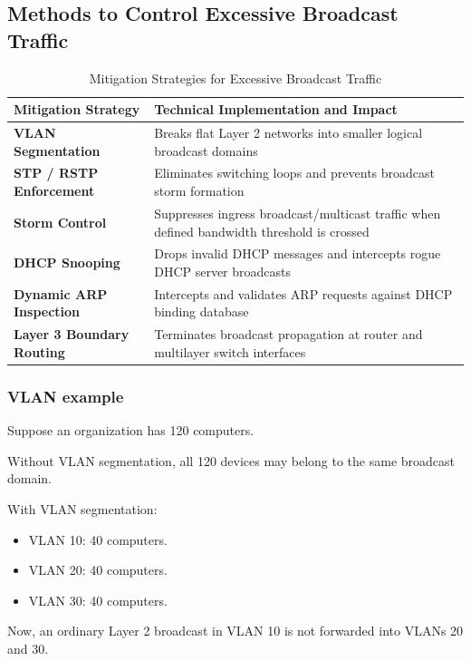 \subsection{Methods to Control Excessive Broadcast Traffic}
\begin{table}[htbp]
\centering
\caption{Mitigation Strategies for Excessive Broadcast Traffic}
\label{tab:broadcast_mitigation_strategies}
\begin{tabularx}{\textwidth}{p{3.8cm} X}
\toprule
\textbf{Mitigation Strategy} & \textbf{Technical Implementation and Impact} \\
\midrule
\textbf{VLAN Segmentation} & Breaks flat Layer 2 networks into smaller logical broadcast domains \\
\textbf{STP / RSTP Enforcement} & Eliminates switching loops and prevents broadcast storm formation \\
\textbf{Storm Control} & Suppresses ingress broadcast/multicast traffic when defined bandwidth threshold is crossed \\
\textbf{DHCP Snooping} & Drops invalid DHCP messages and intercepts rogue DHCP server broadcasts \\
\textbf{Dynamic ARP Inspection} & Intercepts and validates ARP requests against DHCP binding database \\
\textbf{Layer 3 Boundary Routing} & Terminates broadcast propagation at router and multilayer switch interfaces \\
\bottomrule
\end{tabularx}
\end{table}


\subsubsection{VLAN example}

Suppose an organization has 120 computers.

Without VLAN segmentation, all 120 devices may belong to the same broadcast domain.

With VLAN segmentation:

\begin{itemize}
\item VLAN 10: 40 computers.
\item VLAN 20: 40 computers.
\item VLAN 30: 40 computers.
\end{itemize}

Now, an ordinary Layer 2 broadcast in VLAN 10 is not forwarded into VLANs 20 and 30.

